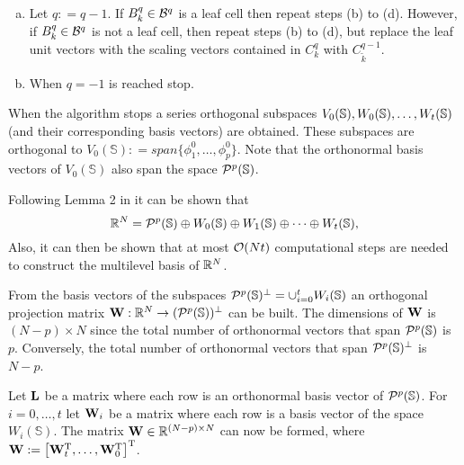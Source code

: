 \documentclass[11pt,final]{amsart}       %
\begin{document}
\begin{enumerate}[(a)]
\item Let $q: = q - 1$. If $B^{q}_{k} \in {\mathcal B}^{q}$ is a leaf cell
  then repeat steps (b) to (d). However, if $B^{q}_{k} \in {\mathcal B}^{q}$
    is not a leaf cell, then repeat steps (b) to (d), but replace the
    leaf unit vectors with the scaling vectors contained in $C^{q}_k$
    with $C^{q-1}_{\tilde k}$.


  \item When $q = -1$ is reached stop.


\end{enumerate}

When the algorithm stops a series orthogonal subspaces
$V_{0}(\mathbb{S}), W_{0}(\mathbb{S}),\dots, W_{t}(\mathbb{S})$ (and their corresponding
basis vectors) are obtained. These subspaces are orthogonal to
$V_{0}(\mathbb{S}) : = span \{ \phi_{1}^{0}, \dots, \phi_{p}^{0}
\}$. Note that the orthonormal basis vectors of $V_{0}(\mathbb{S})$
also span the space ${\mathcal P}^{p}(\mathbb{S})$.
\begin{remark}
Following Lemma 2 in \cite{Castrillon2013} it can be shown that
\[
\Bbb{R}^{N} = {\mathcal P}^{p}(\mathbb{S}) \oplus
W_{0}(\mathbb{S}) 
\oplus W_{1}(\mathbb{S})
\oplus \dots \oplus W_{t}(\mathbb{S}),
\]
Also, it can then be shown that at most ${\mathcal O}(Nt)$
computational steps are needed to construct the multilevel basis of
$\Bbb{R}^{N}$.
\end{remark}

From the basis vectors of the subspaces ${\mathcal P}^{p}(\mathbb{S})^{\perp}
= \cup_{i=0}^{t} W_{i}(\mathbb{S})$ an orthogonal projection matrix
$\mathbf{W}:\Bbb{R}^{N} \rightarrow ({\mathcal P}^{p}(\mathbb{S}))^{\perp}$ can be built.
The dimensions of $\mathbf{W}$ is $(N - p) \times N$ since the total number
of orthonormal vectors that span ${\mathcal P}^{p}(\mathbb{S})$ is
$p$. Conversely, the total number of orthonormal vectors that span
${\mathcal P}^{p}(\mathbb{S})^{\perp}$ is $N-p$.

Let $\mathbf{L}$ be a matrix where each row is an orthonormal basis vector of
${\mathcal P}^{p}(\mathbb{S})$. For $i = 0,\dots,t$ let $\mathbf{W}_i$ be a matrix
where each row is a basis vector of the space $W_i(\mathbb{S})$. The
matrix $\mathbf{W} \in \mathbb{R}^{(N - p) \times N}$ can now be formed,
where $\mathbf{W} := \left[ \mathbf{W}_t^{\rm T}, \dots, \mathbf{W}_0^{\rm T} \right] ^{\rm T}$.
\end{document}
